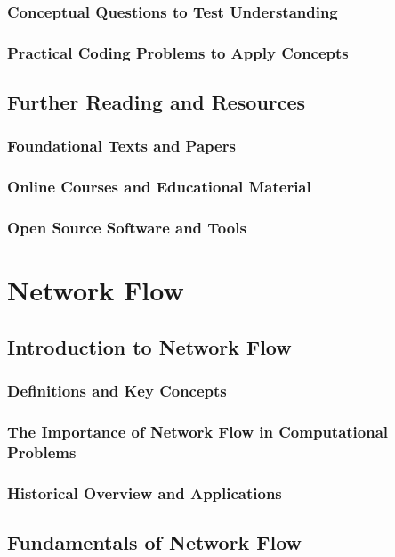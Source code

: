 \documentclass[12pt]{book} %
\begin{document}
\subsection{Conceptual Questions to Test Understanding}
\subsection{Practical Coding Problems to Apply Concepts}

\section{Further Reading and Resources}
\subsection{Foundational Texts and Papers}
\subsection{Online Courses and Educational Material}
\subsection{Open Source Software and Tools}

\chapter{Network Flow}

\section{Introduction to Network Flow}
\subsection{Definitions and Key Concepts}
\subsection{The Importance of Network Flow in Computational Problems}
\subsection{Historical Overview and Applications}

\section{Fundamentals of Network Flow}
\end{document}
